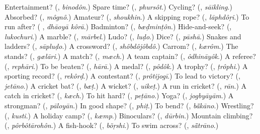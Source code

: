 \begin{tcolorbox}[breakable,colback=teal!4,colframe=teal!35!black,title={Before you move on}]
Entertainment? (\textbf{}, \emph{binodôn}.) Spare time? (\textbf{}, \emph{phursôt}.) Cycling? (\textbf{}, \emph{sāikling}.) Absorbed? (\textbf{}, \emph{môgnô}.) Amateur? (\textbf{}, \emph{shoukhin}.) A skipping rope? (\textbf{}, \emph{lāphdôṛi}.) To run after? (\textbf{ }, \emph{dhāoyā kôrā}.) Badminton? (\textbf{}, \emph{bæḍminṭôn}.) Hide-and-seek? (\textbf{}, \emph{lukochuri}.) A marble? (\textbf{}, \emph{mārbel}.) Ludo? (\textbf{}, \emph{luḍo}.) Dice? (\textbf{}, \emph{pāshā}.) Snakes and ladders? (\textbf{}, \emph{sāpluḍo}.) A crossword? (\textbf{}, \emph{shôbdôjôbdô}.) Carrom? (\textbf{}, \emph{kærôm}.) The stands? (\textbf{}, \emph{gælāri}.) A match? (\textbf{}, \emph{mæch}.) A team captain? (\textbf{}, \emph{ôdhināyôk}.) A referee? (\textbf{}, \emph{rephāri}.) To be beaten? (\textbf{}, \emph{hārā}.) A medal? (\textbf{}, \emph{pôdôk}.) A trophy? (\textbf{}, \emph{ṭrôphi}.) A sporting record? (\textbf{}, \emph{rekôrḍ}.) A contestant? (\textbf{}, \emph{prôtijogī}.) To lead to victory? (\textbf{}, \emph{jetāno}.) A cricket bat? (\textbf{}, \emph{bæṭ}.) A wicket? (\textbf{}, \emph{uikeṭ}.) A run in cricket? (\textbf{}, \emph{rān}.) A catch in cricket? (\textbf{}, \emph{kæch}.) To hit hard? (\textbf{}, \emph{peṭāno}.) Yoga? (\textbf{}, \emph{jogbyāyām}.) A strongman? (\textbf{}, \emph{pāloyān}.) In good shape? (\textbf{}, \emph{phiṭ}.) To bend? (\textbf{}, \emph{bā̃kāno}.) Wrestling? (\textbf{}, \emph{kusti}.) A holiday camp? (\textbf{}, \emph{kæmp}.) Binoculars? (\textbf{}, \emph{dūrbin}.) Mountain climbing? (\textbf{}, \emph{pôrbôtārohôn}.) A fish-hook? (\textbf{}, \emph{bõṛshi}.) To swim across? (\textbf{}, \emph{sā̃trāno}.)
\end{tcolorbox}
